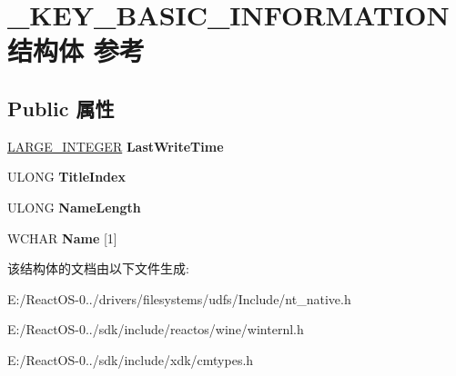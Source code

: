 \hypertarget{struct___k_e_y___b_a_s_i_c___i_n_f_o_r_m_a_t_i_o_n}{}\section{\+\_\+\+K\+E\+Y\+\_\+\+B\+A\+S\+I\+C\+\_\+\+I\+N\+F\+O\+R\+M\+A\+T\+I\+O\+N结构体 参考}
\label{struct___k_e_y___b_a_s_i_c___i_n_f_o_r_m_a_t_i_o_n}
\subsection*{Public 属性}
\begin{DoxyCompactItemize}
\item 
\mbox{\label{struct___k_e_y___b_a_s_i_c___i_n_f_o_r_m_a_t_i_o_n_a1e9dd6ef24397d921a28a4d565702a51}} 
\hyperlink{union___l_a_r_g_e___i_n_t_e_g_e_r}{L\+A\+R\+G\+E\+\_\+\+I\+N\+T\+E\+G\+ER} {\bfseries Last\+Write\+Time}
\item 
\mbox{\label{struct___k_e_y___b_a_s_i_c___i_n_f_o_r_m_a_t_i_o_n_a7320a0f885e831222b11beab91d74ca9}} 
U\+L\+O\+NG {\bfseries Title\+Index}
\item 
\mbox{\label{struct___k_e_y___b_a_s_i_c___i_n_f_o_r_m_a_t_i_o_n_afae31f01287262679ac988e567e0b774}} 
U\+L\+O\+NG {\bfseries Name\+Length}
\item 
\mbox{\label{struct___k_e_y___b_a_s_i_c___i_n_f_o_r_m_a_t_i_o_n_a59beb4a726fd868b08ec17af9e7c86f5}} 
W\+C\+H\+AR {\bfseries Name} \mbox{[}1\mbox{]}
\end{DoxyCompactItemize}


该结构体的文档由以下文件生成\+:\begin{DoxyCompactItemize}
\item 
E\+:/\+React\+O\+S-\/0../drivers/filesystems/udfs/\+Include/nt\+\_\+native.\+h\item 
E\+:/\+React\+O\+S-\/0../sdk/include/reactos/wine/winternl.\+h\item 
E\+:/\+React\+O\+S-\/0../sdk/include/xdk/cmtypes.\+h\end{DoxyCompactItemize}
